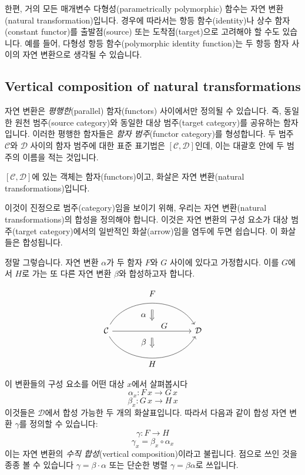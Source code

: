 \documentclass[DaoFP]{subfiles}
\begin{document}
한편, 거의 모든 매개변수 다형성(parametrically polymorphic) 함수는 자연 변환(natural transformation)입니다. 경우에 따라서는 항등 함수(identity)나 상수 함자(constant functor)를 출발점(source) 또는 도착점(target)으로 고려해야 할 수도 있습니다. 예를 들어, 다형성 항등 함수(polymorphic identity function)는 두 항등 함자 사이의 자연 변환으로 생각될 수 있습니다.

\subsection{Vertical composition of natural transformations}

자연 변환은 \emph{평행한}(parallel) 함자(functors) 사이에서만 정의될 수 있습니다. 즉, 동일한 원천 범주(source category)와 동일한 대상 범주(target category)를 공유하는 함자입니다. 이러한 평행한 함자들은 \emph{함자 범주}(functor category)를 형성합니다. 두 범주 $\mathcal{C}$와 $\mathcal{D}$ 사이의 함자 범주에 대한 표준 표기법은 $[\mathcal{C}, \mathcal{D}]$인데, 이는 대괄호 안에 두 범주의 이름을 적는 것입니다.

$[\mathcal{C}, \mathcal{D}]$에 있는 객체는 함자(functors)이고, 화살은 자연 변환(natural transformations)입니다.

이것이 진정으로 범주(category)임을 보이기 위해, 우리는 자연 변환(natural transformations)의 합성을 정의해야 합니다. 이것은 자연 변환의 구성 요소가 대상 범주(target category)에서의 일반적인 화살(arrow)임을 염두에 두면 쉽습니다. 이 화살들은 합성됩니다.

정말 그렇습니다. 자연 변환 $\alpha$가 두 함자 $F$와 $G$ 사이에 있다고 가정합시다. 이를 $G$에서 $H$로 가는 또 다른 자연 변환 $\beta$와 합성하고자 합니다.

\[
\begin{tikzcd}[column sep=huge]
\mathcal{C}
  \arrow[bend left=60]{rr}[name=U, label=above:$F$]{}
  \arrow[]{rr}[name=M, label={[xshift=15pt, yshift=-5pt]:$G$}]{} 
  \arrow[bend right=60]{rr}[name=D, label=below:$H$]{} 
 &&
\mathcal{D}
  \arrow[shorten <=8pt, shorten >=8pt,Rightarrow, to path={(U) -- node[label=left:$\alpha$] {} (M)}]{}
  \arrow[shorten <=8pt, shorten >=8pt,Rightarrow, to path={(M) -- node[label=left:$\beta$] {} (D)}]{}
\end{tikzcd}
\]


이 변환들의 구성 요소를 어떤 대상 $x$에서 살펴봅시다
\[ \alpha_x \colon F \, x \to G \, x \]
\[ \beta_x \colon G \, x \to H \, x \]
이것들은 $\mathcal{D}$에서 합성 가능한 두 개의 화살표입니다. 따라서 다음과 같이 합성 자연 변환 $\gamma$를 정의할 수 있습니다:
\[ \gamma \colon F \to H\]
\[ \gamma_x = \beta_x \circ \alpha_x \]
이는 자연 변환의 \emph{수직 합성}(vertical composition)이라고 불립니다. 점으로 쓰인 것을 종종 볼 수 있습니다 $\gamma = \beta \cdot \alpha$ 또는 단순한 병렬 $\gamma = \beta \alpha$로 쓰입니다.
 
\end{document}
